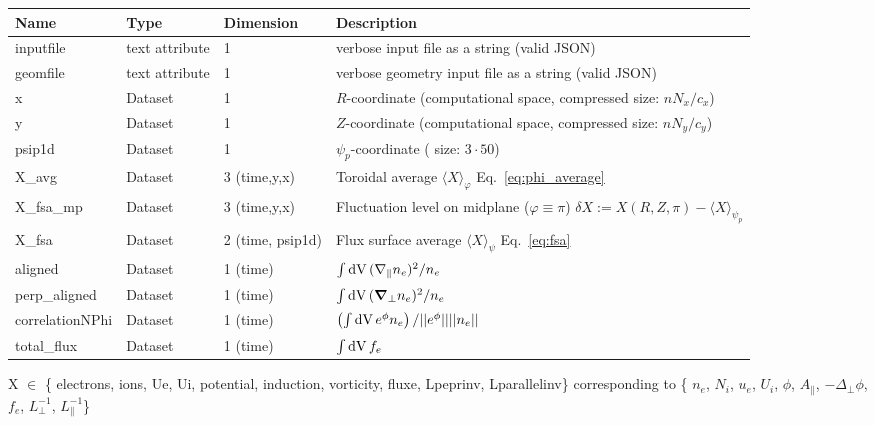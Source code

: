 \begin{longtable}{lll>{\RaggedRight}p{7cm}}
\toprule
\rowcolor{gray!50}\textbf{Name} &  \textbf{Type} & \textbf{Dimension} & \textbf{Description}  \\ \midrule
inputfile  &     text attribute & 1 & verbose input file as a string (valid JSON) \\
geomfile   &     text attribute & 1 & verbose geometry input file as a string (valid JSON) \\
x                & Dataset & 1 & $R$-coordinate (computational space, compressed size: $nN_x/c_x$)\\
y                & Dataset & 1 & $Z$-coordinate (computational space, compressed size: $nN_y/c_y$)\\
psip1d           & Dataset & 1 & $\psi_p$-coordinate ( size: $3\cdot 50$) \\
X\_avg           & Dataset & 3 (time,y,x) & Toroidal average $\langle X
    \rangle_\varphi$ Eq.~\eqref{eq:phi_average} \\
X\_fsa\_mp       & Dataset & 3 (time,y,x) & Fluctuation level on midplane ($\varphi\equiv \pi$) $\delta X := X(R,Z,\pi) - \langle X\rangle_{\psi_{p}}$ \\
X\_fsa           & Dataset & 2 (time, psip1d) & Flux surface average $\langle X\rangle_\psi$ Eq.~\eqref{eq:fsa} \\
aligned          & Dataset & 1 (time) & $\int \mathrm{dV}\, (\nabla_\parallel n_e)^2 /n_e$ \\
perp\_aligned    & Dataset & 1 (time) & $\int \mathrm{dV}\, ({\boldsymbol{\nabla}}_\perp n_e)^2 /n_e$ \\
correlationNPhi  & Dataset & 1 (time) & $\left( \int\mathrm{dV}\, e^\phi n_e \right)/ ||e^\phi||||n_e||$\\
total\_flux      & Dataset & 1 (time) & $\int \mathrm{dV}\, f_e$\\
\bottomrule
\end{longtable}
X $\in$ \{ electrons, ions, Ue, Ui, potential,
induction, vorticity, fluxe, Lpeprinv, Lparallelinv\} corresponding to \{
    $n_e$, $N_i$, $u_e$, $U_i$, $\phi$, $A_\parallel$, $-\Delta_\perp \phi$,
    $f_e$, $L_\perp^{-1}$, $L_\parallel^{-1}$\}











